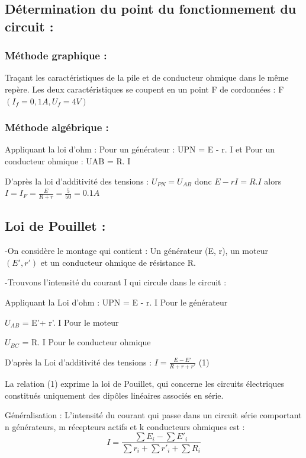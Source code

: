 \documentclass[12pt]{article}
\begin{document}
\subsection{Détermination du point du fonctionnement du circuit :}
\subsubsection{Méthode graphique :}
Traçant les caractéristiques de la pile et de conducteur ohmique dans le même repère.
Les deux caractéristiques se
coupent en un point F de
cordonnées : F$(I_f = 0, 1 A , U_f = 4 V )$
\subsubsection{ Méthode algébrique :}
Appliquant la loi d’ohm : Pour un générateur : UPN = E - r. I et Pour un conducteur ohmique : UAB = R. I

D’après la loi d’additivité des tensions : $U_{PN} = U_{AB}$
 donc $E-rI = R.I$
 alors $I = I_F = \frac{E}{R + r} = \frac{5}{50} = 0.1A$

\subsection{Loi de Pouillet : }

-On considère le montage qui contient :
Un générateur (E, r), un moteur $(E', r')$ et un conducteur ohmique de résistance R.

-Trouvons l’intensité du courant I qui circule dans le
circuit :

Appliquant la Loi d’ohm : UPN = E - r. I  Pour le générateur

$U_{AB}$ = E'+ r'. I Pour le moteur

$U_{BC}$ = R. I Pour le conducteur ohmique

D’après la Loi d’additivité des tensions : $I = \frac{E - E'}{R + r + r'}$ (1)

La relation (1) exprime la loi de Pouillet, qui concerne les circuits électriques constitués uniquement des dipôles linéaires associés en série.

\begin{tcolorbox}{Généralisation :} 
L’intensité du courant qui passe dans un circuit série comportant n générateurs, m récepteurs
  actifs et k conducteurs ohmiques est :$$I = \frac{\sum E_i - \sum E'_i}{\sum r_i + \sum r'_i + \sum R_i}$$
\end{tcolorbox}
\end{document}
